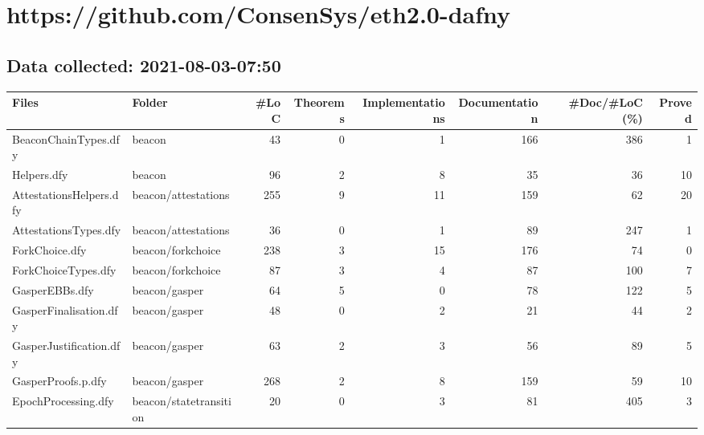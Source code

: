 \documentclass[a4paper, 12pt]{article}
\begin{document}
\section*{https://github.com/ConsenSys/eth2.0-dafny}
\subsection*{Data collected: 2021-08-03-07:50}
\scriptsize
\begin{tabular}{llrrrrrr}
\toprule
                   Files &                  Folder &  \#LoC &  Theorems &  Implementations &  Documentation &  \#Doc/\#LoC (\%) &  Proved \\
\midrule
    BeaconChainTypes.dfy &                  beacon &    43 &         0 &                1 &            166 &            386 &       1 \\
             Helpers.dfy &                  beacon &    96 &         2 &                8 &             35 &             36 &      10 \\
 AttestationsHelpers.dfy &     beacon/attestations &   255 &         9 &               11 &            159 &             62 &      20 \\
   AttestationsTypes.dfy &     beacon/attestations &    36 &         0 &                1 &             89 &            247 &       1 \\
          ForkChoice.dfy &       beacon/forkchoice &   238 &         3 &               15 &            176 &             74 &       0 \\
     ForkChoiceTypes.dfy &       beacon/forkchoice &    87 &         3 &                4 &             87 &            100 &       7 \\
          GasperEBBs.dfy &           beacon/gasper &    64 &         5 &                0 &             78 &            122 &       5 \\
  GasperFinalisation.dfy &           beacon/gasper &    48 &         0 &                2 &             21 &             44 &       2 \\
 GasperJustification.dfy &           beacon/gasper &    63 &         2 &                3 &             56 &             89 &       5 \\
      GasperProofs.p.dfy &           beacon/gasper &   268 &         2 &                8 &            159 &             59 &      10 \\
     EpochProcessing.dfy &  beacon/statetransition &    20 &         0 &                3 &             81 &            405 &       3 \\

\end{tabular}
\end{document}
